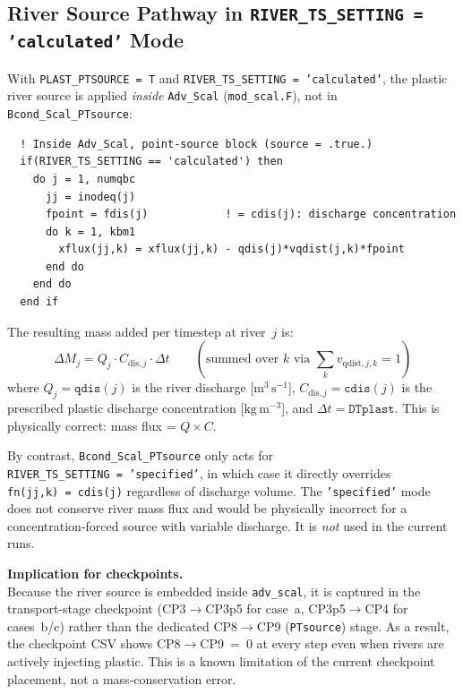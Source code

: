\documentclass[11pt]{article}
\begin{document}
\subsection*{River Source Pathway in \texttt{RIVER\_TS\_SETTING = 'calculated'} Mode}

With \texttt{PLAST\_PTSOURCE~=~T} and
\texttt{RIVER\_TS\_SETTING~=~'calculated'},
the plastic river source is applied \emph{inside} \texttt{Adv\_Scal}
(\texttt{mod\_scal.F}), not in \texttt{Bcond\_Scal\_PTsource}:

\begin{verbatim}
  ! Inside Adv_Scal, point-source block (source = .true.)
  if(RIVER_TS_SETTING == 'calculated') then
    do j = 1, numqbc
      jj = inodeq(j)
      fpoint = fdis(j)            ! = cdis(j): discharge concentration
      do k = 1, kbm1
        xflux(jj,k) = xflux(jj,k) - qdis(j)*vqdist(j,k)*fpoint
      end do
    end do
  end if
\end{verbatim}

The resulting mass added per timestep at river~$j$ is:
\begin{equation}
  \Delta M_j = Q_j \cdot C_{\text{dis},j} \cdot \Delta t
  \qquad (\text{summed over } k \text{ via } \textstyle\sum_k v_{\text{qdist},j,k} = 1)
  \label{eq:dMj}
\end{equation}
where $Q_j = \texttt{qdis}(j)$ is the river discharge
[$\mathrm{m^3\,s^{-1}}$], $C_{\text{dis},j} = \texttt{cdis}(j)$
is the prescribed plastic discharge concentration
[$\mathrm{kg\,m^{-3}}$], and $\Delta t = \texttt{DTplast}$.
This is physically correct: mass flux = $Q \times C$.

By contrast, \texttt{Bcond\_Scal\_PTsource} only acts for
\texttt{RIVER\_TS\_SETTING~=~'specified'}, in which case it
directly overrides \texttt{fn(jj,k)~=~cdis(j)} regardless of
discharge volume.  The \texttt{'specified'} mode does not conserve
river mass flux and would be physically incorrect for a concentration-forced
source with variable discharge.  It is \emph{not} used in the current runs.

\textbf{Implication for checkpoints.}\\
Because the river source is embedded inside \texttt{adv\_scal}, it is
captured in the transport-stage checkpoint (CP3$\to$CP3p5 for case~a,
CP3p5$\to$CP4 for cases~b/c) rather than the dedicated
CP8$\to$CP9 (\texttt{PTsource}) stage.  As a result, the checkpoint
CSV shows CP8$\to$CP9~=~0 at every step even when rivers are actively
injecting plastic.  This is a known limitation of the current checkpoint
placement, not a mass-conservation error.
\end{document}
